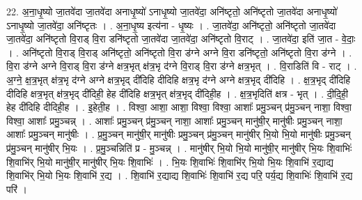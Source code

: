 \documentclass[17pt]{extarticle}
\begin{document}
22. अ॒ना॒धृ॒ष्यो जा॒तवे॑दा जा॒तवे॑दा अनाधृ॒ष्यो॑ ऽनाधृ॒ष्यो जा॒तवे॑दा॒ अनि॑ष्टृतो॒ अनि॑ष्टृतो जा॒तवे॑दा अनाधृ॒ष्यो॑ ऽनाधृ॒ष्यो जा॒तवे॑दा॒ अनि॑ष्टृतः । . अ॒ना॒धृ॒ष्य इत्य॑ना - धृ॒ष्यः । . जा॒तवे॑दा॒ अनि॑ष्टृतो॒ अनि॑ष्टृतो जा॒तवे॑दा जा॒तवे॑दा॒ अनि॑ष्टृतो वि॒राड् वि॒रा डनि॑ष्टृतो जा॒तवे॑दा जा॒तवे॑दा॒ अनि॑ष्टृतो वि॒राट् । . जा॒तवे॑दा॒ इति॑ जा॒त - वे॒दाः॒ । . अनि॑ष्टृतो वि॒राड् वि॒राड् अनि॑ष्टृतो॒ अनि॑ष्टृतो वि॒रा ड॑ग्ने अग्ने वि॒रा डनि॑ष्टृतो॒ अनि॑ष्टृतो वि॒रा ड॑ग्ने । . वि॒रा ड॑ग्ने अग्ने वि॒राड् वि॒रा ड॑ग्ने क्षत्र॒भृत् क्ष॑त्र॒भृ द॑ग्ने वि॒राड् वि॒रा ड॑ग्ने क्षत्र॒भृत् । . वि॒राडिति॑ वि - राट् । . अ॒ग्ने॒ क्ष॒त्र॒भृत् क्ष॑त्र॒भृ द॑ग्ने अग्ने क्षत्र॒भृद् दी॑दिहि दीदिहि क्षत्र॒भृ द॑ग्ने अग्ने क्षत्र॒भृद् दी॑दिहि । . क्ष॒त्र॒भृद् दी॑दिहि दीदिहि क्षत्र॒भृत् क्ष॑त्र॒भृद् दी॑दिही॒ हेह दी॑दिहि क्षत्र॒भृत् क्ष॑त्र॒भृद् दी॑दिही॒ह । . क्ष॒त्र॒भृदिति॑ क्षत्र - भृत् । . दी॒दि॒ही॒ हेह दी॑दिहि दीदिही॒ह । . इ॒हेती॒ह । . विश्वा॒ आशा॒ आशा॒ विश्वा॒ विश्वा॒ आशाः᳚ प्रमु॒ञ्चन् प्र॑मु॒ञ्चन् नाशा॒ विश्वा॒ विश्वा॒ आशाः᳚ प्रमु॒ञ्चन्न् । . आशाः᳚ प्रमु॒ञ्चन् प्र॑मु॒ञ्चन् नाशा॒ आशाः᳚ प्रमु॒ञ्चन् मानु॑षी॒र् मानु॑षीः प्रमु॒ञ्चन् नाशा॒ आशाः᳚ प्रमु॒ञ्चन् मानु॑षीः । . प्र॒मु॒ञ्चन् मानु॑षी॒र् मानु॑षीः प्रमु॒ञ्चन् प्र॑मु॒ञ्चन् मानु॑षीर् भि॒यो भि॒यो मानु॑षीः प्रमु॒ञ्चन् प्र॑मु॒ञ्चन् मानु॑षीर् भि॒यः । . प्र॒मु॒ञ्चन्निति॑ प्र - मु॒ञ्चन्न् । . मानु॑षीर् भि॒यो भि॒यो मानु॑षी॒र् मानु॑षीर् भि॒यः शि॒वाभिः॑ शि॒वाभि॑र् भि॒यो मानु॑षी॒र् मानु॑षीर् भि॒यः शि॒वाभिः॑ । . भि॒यः शि॒वाभिः॑ शि॒वाभि॑र् भि॒यो भि॒यः शि॒वाभि॑ र॒द्याद्य शि॒वाभि॑र् भि॒यो भि॒यः शि॒वाभि॑ र॒द्य । . शि॒वाभि॑ र॒द्याद्य शि॒वाभिः॑ शि॒वाभि॑ र॒द्य परि॒ पर्य॒द्य शि॒वाभिः॑ शि॒वाभि॑ र॒द्य परि॑ । \newline
\end{document}
